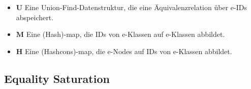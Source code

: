 \begin{itemize}
  \item $\mathbf{U}$ Eine Union-Find-Datenstruktur, die eine Äquivalenzrelation über e-IDs abspeichert.
  \item $\mathbf{M}$ Eine (Hash)-map, die IDs von e-Klassen auf e-Klassen abbildet. 
  \item $\mathbf{H}$ Eine (Hashcons)-map, die e-Nodes auf IDs von e-Klassen abbildet.
\end{itemize}

\subsection{Equality Saturation}

